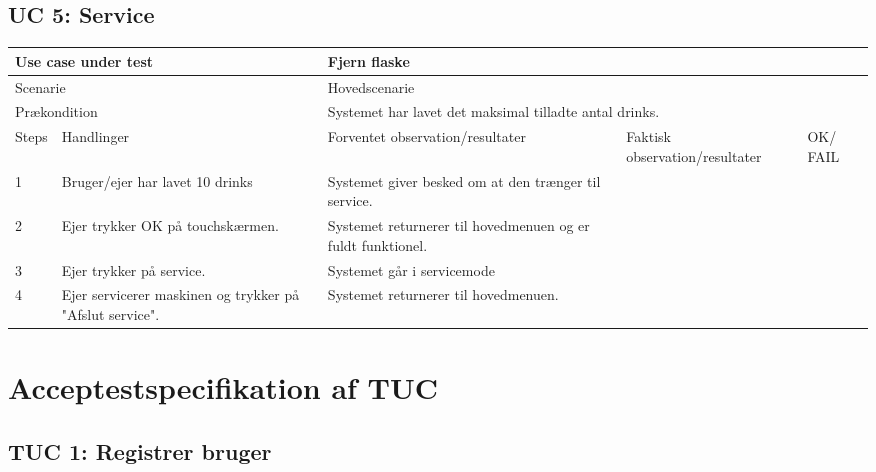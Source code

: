 \subsection{UC 5: Service}

\begin{table}[H]
\begin{tabular}{|p{1cm}|p{4cm}|p{4cm}|p{4cm}|p{1cm}|}
\hline
\multicolumn{2}{|p{5cm}|}{Use case under test} & \multicolumn{3}{p{9cm}|}{Fjern flaske}                                       \\ \hline
\multicolumn{2}{|p{5cm}|}{Scenarie}            & \multicolumn{3}{p{9cm}|}{Hovedscenarie}                                          \\ \hline
\multicolumn{2}{|p{5cm}|}{Prækondition}        & \multicolumn{3}{p{9cm}|}{Systemet har lavet det maksimal tilladte antal drinks.}                                 \\ \hline
Steps               & Handlinger          & Forventet observation/resultater & Faktisk observation/resultater & OK/ FAIL \\ \hline
1    & Bruger/ejer har lavet 10 drinks  & Systemet giver besked om at den trænger til service. &   &         \\ \hline
2    & Ejer trykker OK på touchskærmen.  & Systemet returnerer til hovedmenuen og er fuldt funktionel.&   &         \\ \hline
3    & Ejer trykker på service.  & Systemet går i servicemode  & &  \\ \hline
4    & Ejer servicerer maskinen og trykker på "Afslut service".  & Systemet returnerer til hovedmenuen.  & &  \\ \hline

\end{tabular}
\end{table}


\section{Acceptestspecifikation af TUC}

\subsection{TUC 1: Registrer bruger}

